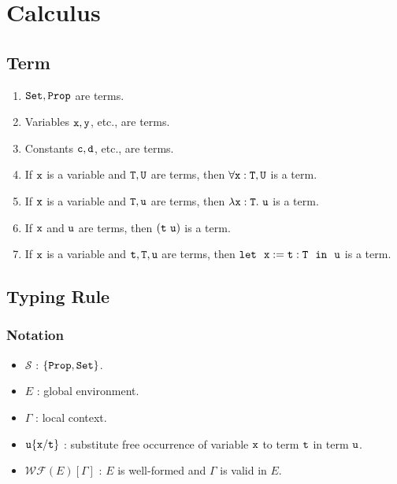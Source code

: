 \section{Calculus}

\subsection{Term}

\begin{enumerate}
    \item $\tt Set,Prop$ are terms.
    \item Variables $\tt x,y$, etc., are terms.
    \item Constants $\tt c,d$, etc., are terms.
    \item If $\tt x$ is a variable and $\tt T,U$ are terms, then $\forall\tt x:T,U$ is a term.
    \item If $\tt x$ is a variable and $\tt T,u$ are terms, then $\lambda\tt x:T.\ u$ is a term.
    \item If $\tt x$ and $\tt u$ are terms, then $\tt (t\ u)$ is a term.
    \item If $\tt x$ is a variable and $\tt t,T,u$ are terms, then $\tt let\ \ x:=t:T\ \ in\ \ u$ is a term.
\end{enumerate}

\subsection{Typing Rule}

\subsubsection{Notation}
\begin{itemize}
\item $\mathcal S$ : $\{\tt Prop,Set\}$.
\item $E$ : global environment.
\item $\Gamma$ : local context.
\item $\tt u\{x/t\}$ : substitute free occurrence of variable $\tt x$ to term $\tt t$ in term $\tt u$.
\item $\mathcal{WF}(E)[\Gamma]$ : $E$ is well-formed and $\Gamma$ is valid in $E$.
\end{itemize}

